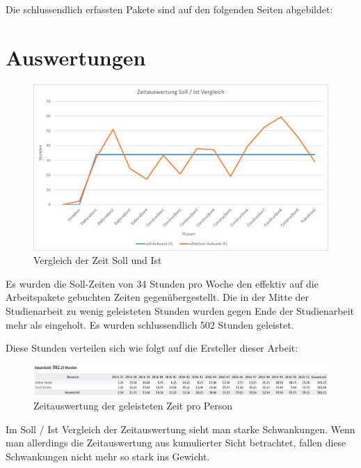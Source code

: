  Die schlussendlich erfassten Pakete sind auf den folgenden Seiten abgebildet:
 
 
 
 \section{Auswertungen}
 \begin{figure}[H]
 	\centering
 	\includegraphics[width=1\textwidth]
 	{Images/ZeitauswertungSollIst.png}
 	\caption{Vergleich der Zeit Soll und Ist}
 \end{figure}
 
 Es wurden die Soll-Zeiten von 34 Stunden pro Woche den effektiv auf die Arbeitspakete gebuchten Zeiten gegenübergestellt. Die in der Mitte der Studienarbeit zu wenig geleisteten Stunden wurden gegen Ende der Studienarbeit mehr als eingeholt. Es wurden schlussendlich 502 Stunden geleistet.
 
 \bigskip
 
 Diese Stunden verteilen sich wie folgt auf die Ersteller dieser Arbeit:
 
 \begin{figure}[H]
 	\centering
 	\includegraphics[width=1\textwidth]
 	{Images/ZeitauswertungBenutzer.png}
 	\caption{Zeitauswertung der geleisteten Zeit pro Person}
 \end{figure}
 
 Im Soll / Ist Vergleich der Zeitauswertung sieht man starke Schwankungen. Wenn man allerdings die Zeitauswertung aus kumulierter Sicht betrachtet, fallen diese Schwankungen nicht mehr so stark ins Gewicht. 
 
